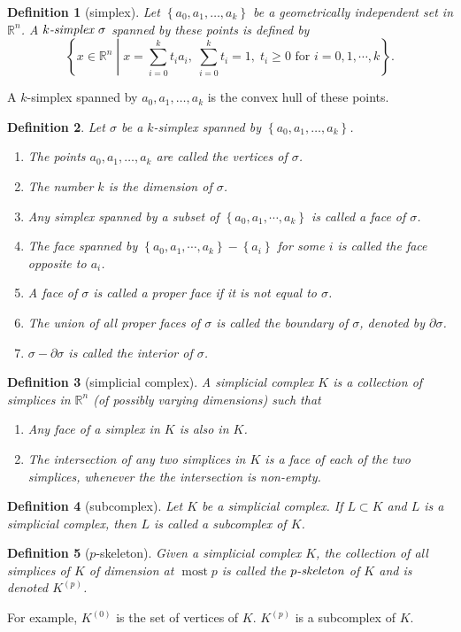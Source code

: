 \documentclass{report}
\newtheorem{definition}{Definition}[section]
\theoremstyle{nonumberplain}
\begin{document}
\begin{definition}[simplex]
Let $\left\{a_0, a_1, \ldots, a_k\right\}$ be a geometrically independent set in $\mathbb{R}^n$. A $\emph{$k$-simplex } \sigma$ spanned by these points is defined by
$$
\left\{x\in \mathbb{R}^n\;\left|\; x=\sum_{i=0}^k t_i a_i,\;\sum_{i=0}^k t_i=1,\;t_i \geq 0\text{ for }i = 0,1,\cdots, k\right.\right\}.
$$
\end{definition}

\noindent A $k$-simplex spanned by $a_0, a_1, \ldots, a_k$ is the convex hull of these points.
\begin{definition}
Let $\sigma$ be a $k$-simplex spanned by $\left\{a_0, a_1, \ldots, a_k\right\}$.
\begin{enumerate}
	\item The points $a_0, a_1, \ldots, a_k$ are called the \emph{vertices} of $\sigma$.
	\item The number $k$ is the \emph{dimension} of $\sigma$.
	\item Any simplex spanned by a subset of $\left\{a_0, a_1, \cdots, a_k\right\}$ is called a \emph{face} of $\sigma$. 
	\item The face spanned by $\left\{a_0, a_1, \cdots, a_k\right\}-\left\{a_i\right\}$ for some $i$ is called the \emph{face opposite} to $a_i$.
	\item A face of $\sigma$ is called a \emph{proper face} if it is not equal to $\sigma$.
	\item The union of all proper faces of $\sigma$ is called the \emph{boundary} of $\sigma$, denoted by $\partial \sigma$.
	\item $\sigma-\partial \sigma$ is called the \emph{interior} of $\sigma$.
\end{enumerate}
\end{definition}
\begin{definition}[simplicial complex]
A \emph{simplicial complex} $K$ is a collection of simplices in $\mathbb{R}^n$ (of possibly varying dimensions) such that
\begin{enumerate}
	\item Any face of a simplex in $K$ is also in $K$.
	\item The intersection of any two simplices in $K$ is a face of each of the two simplices, whenever the the intersection is non-empty.
\end{enumerate}
\end{definition}

\begin{definition}[subcomplex]
Let $K$ be a simplicial complex. If $L\subset K$ and $L$ is a simplicial complex, then $L$ is called a \emph{subcomplex} of $K$.
\end{definition}
\begin{definition}[$p$-skeleton]
Given a simplicial complex $K$, the collection of all simplices of $K$ of dimension at $\operatorname{most} p$ is called the $\emph{$p$-skeleton}$ of $K$ and is denoted $K^{(p)}$.
\end{definition}
For example, $K^{(0)}$ is the set of vertices of $K$. $K^{(p)}$ is a subcomplex of $K$.
\end{document}
